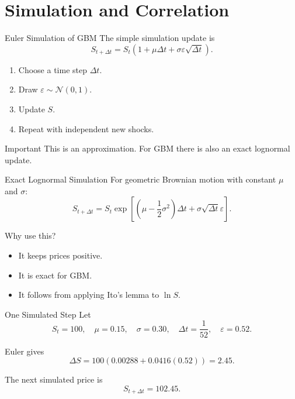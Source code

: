 \documentclass[aspectratio=169,11pt]{beamer}
\newcommand{\dt}{\Delta t}
\newcommand{\eps}{\varepsilon}
\newcommand{\Normal}{\mathcal{N}}
\newcommand{\Ito}{Ito}
\begin{document}
\section{Simulation and Correlation}

\begin{frame}{Euler Simulation of GBM}
    The simple simulation update is
    \[
        S_{t+\dt}
        =
        S_t\left(1+\mu\dt+\sigma\eps\sqrt{\dt}\right).
    \]

    \begin{enumerate}
        \item Choose a time step \(\dt\).
        \item Draw \(\eps\sim\Normal(0,1)\).
        \item Update \(S\).
        \item Repeat with independent new shocks.
    \end{enumerate}

    \begin{alertblock}{Important}
        This is an approximation. For GBM there is also an exact lognormal update.
    \end{alertblock}
\end{frame}

\begin{frame}[label=lognormal_sim_main]{Exact Lognormal Simulation}
    For geometric Brownian motion with constant \(\mu\) and \(\sigma\):
    \[
        S_{t+\dt}
        =
        S_t
        \exp\left[
            \left(\mu-\frac{1}{2}\sigma^2\right)\dt
            +
            \sigma\sqrt{\dt}\eps
        \right].
    \]

    \begin{block}{Why use this?}
        \begin{itemize}
            \item It keeps prices positive.
            \item It is exact for GBM.
            \item It follows from applying \Ito's lemma to \(\ln S\).
        \end{itemize}
    \end{block}

    \hyperlink{deriv_lognormal}{}
\end{frame}

\begin{frame}{One Simulated Step}
    Let
    \[
        S_t=100,\quad
        \mu=0.15,\quad
        \sigma=0.30,\quad
        \dt=\frac{1}{52},\quad
        \eps=0.52.
    \]

    Euler gives
    \[
        \Delta S
        =
        100(0.00288+0.0416(0.52))
        =
        2.45.
    \]

    The next simulated price is
    \[
        S_{t+\dt}=102.45.
    \]
\end{frame}
\end{document}
